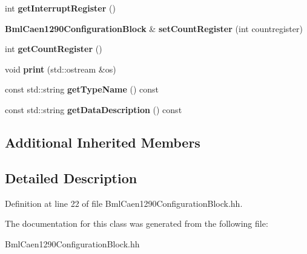 \begin{DoxyCompactItemize}
\item 
int {\bfseries get\-Interrupt\-Register} ()\label{classCALICE_1_1BmlCaen1290ConfigurationBlock_aaee03cf540e2494f17dc7837f32137d0}

\item 
{\bf Bml\-Caen1290\-Configuration\-Block} \& {\bfseries set\-Count\-Register} (int countregister)\label{classCALICE_1_1BmlCaen1290ConfigurationBlock_a457aedeb41da454148865f66f82c1ba4}

\item 
int {\bfseries get\-Count\-Register} ()\label{classCALICE_1_1BmlCaen1290ConfigurationBlock_a0c3d644ba875e29f3ce31fb0da51941f}

\item 
void {\bfseries print} (std\-::ostream \&os)\label{classCALICE_1_1BmlCaen1290ConfigurationBlock_adbb29adf8d9fd7ecd6e7176ac4348e13}

\item 
const std\-::string {\bfseries get\-Type\-Name} () const \label{classCALICE_1_1BmlCaen1290ConfigurationBlock_a1c568fad015045482af859b6432b1838}

\item 
const std\-::string {\bfseries get\-Data\-Description} () const \label{classCALICE_1_1BmlCaen1290ConfigurationBlock_a20a49557bcb139b1047748ce0cbd809a}

\end{DoxyCompactItemize}
\subsection*{Additional Inherited Members}


\subsection{Detailed Description}


Definition at line 22 of file Bml\-Caen1290\-Configuration\-Block.\-hh.



The documentation for this class was generated from the following file\-:\begin{DoxyCompactItemize}
\item 
Bml\-Caen1290\-Configuration\-Block.\-hh\end{DoxyCompactItemize}
